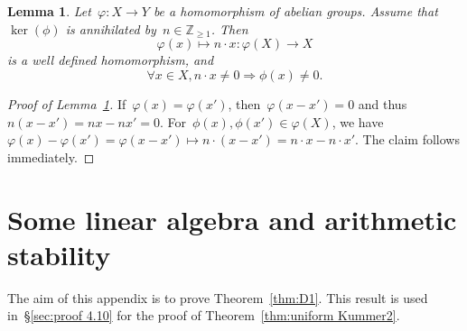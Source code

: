 \documentclass[12pt]{amsart}
\newtheorem{theorem}{Theorem}[section]
\newtheorem{lemma}[theorem]{Lemma}
\newcommand{\Z}{{\mathbb Z}}
\newcommand{\Q}{{\mathbb Q}}
\newcommand{\ol}{\overline}
\newcommand{\wh}{\widehat}
\DeclareMathOperator{\coker}{\operatorname{coker}}
\begin{document}
%
\appendix
\section{}
\begin{lemma}\label{lem:liftkernel}
Let~$\varphi:X\to Y$ be a homomorphism of abelian groups. Assume that~$\ker(\phi)$ is annihilated by~$n\in\Z_{\geq1}$. Then
\[
\varphi(x)\mapsto n\cdot x:\varphi(X)\to X 
\]
is a well defined homomorphism, and
\[
\forall x\in X, n\cdot x\neq 0\Rightarrow \phi(x)\neq 0.
\]
\end{lemma}
\begin{proof}[Proof of Lemma~\ref{lem:liftkernel}]If~$\varphi(x)=\varphi(x')$, then~$\varphi(x-x')=0$ and thus~$n(x-x')=nx-nx'=0$. For~$\phi(x),\phi(x')\in \varphi(X)$, we have~$\varphi(x)-\varphi(x')=\varphi(x-x')\mapsto n\cdot (x-x')=n\cdot x- n\cdot x'$. The claim follows immediately.
\end{proof}
%
%
%


\section{Some linear algebra and arithmetic stability}\label{App:B}
The aim of this appendix is to prove Theorem~\ref{thm:D1}. This result is used in~\S\ref{sec:proof 4.10} for the proof of Theorem~\ref{thm:uniform Kummer2}.
\end{document}
